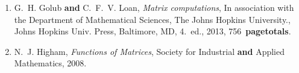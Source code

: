 \documentclass[12pt,a4paper]{report}
\begin{document}
\begin{enumerate}[label=(\arabic*)]

\item G.~H. Golub \textbf{and} C.~F.~V. Loan,
\textit{Matrix computations},
In association with the Department of Mathematical Sciences,
The Johns Hopkins University.,
Johns Hopkins Univ. Press, Baltimore, MD, 4.~ed., 2013, 756~\textbf{pagetotals}.

\item N.~J. Higham,
\textit{Functions of Matrices},
Society for Industrial \textbf{and} Applied Mathematics, 2008.

\end{enumerate}
\end{document}
